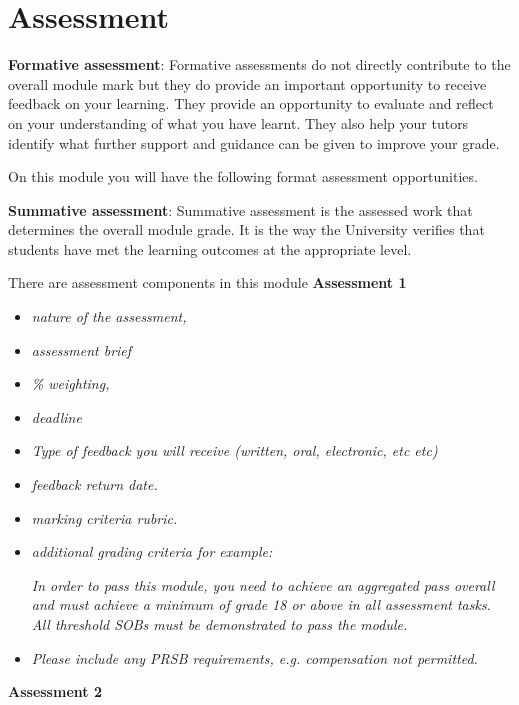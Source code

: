 \documentclass{MDXHandbook}
\begin{document}
\section{Assessment}
\textbf{Formative assessment}: Formative assessments do not directly contribute to the overall module mark but they do provide an important opportunity to receive feedback on your learning. They provide an opportunity to evaluate and reflect on your understanding of what you have learnt. They also help your tutors identify what further support and guidance can be given to improve your grade. 

On this module you will have the following format assessment opportunities. 

\textbf{Summative assessment}: Summative assessment is the assessed work that determines the overall module grade. It is the way the University verifies that students have met the learning outcomes at the appropriate level. 

There are  assessment components in this module 
\textbf{Assessment 1}

\begin{itemize}
	\item \emph{nature of the assessment,}
	\item \emph{assessment brief}
	\item \emph{\% weighting, }
	\item \emph{deadline} 
	\item \emph{Type of feedback you will receive (written, oral, electronic, etc etc)}
	\item \emph{feedback return date. }
	\item \emph{marking criteria rubric. }
	\item \emph{additional grading criteria for example:}
	
	\emph{In order to pass this module, you need to achieve an aggregated pass overall and must achieve a minimum of grade 18 or above in all assessment tasks. 
	All threshold SOBs must be demonstrated to pass the module.}

	\item \emph{Please include any PRSB requirements, e.g. compensation not permitted. }
\end{itemize}
\textbf{Assessment 2 }
\end{document}
